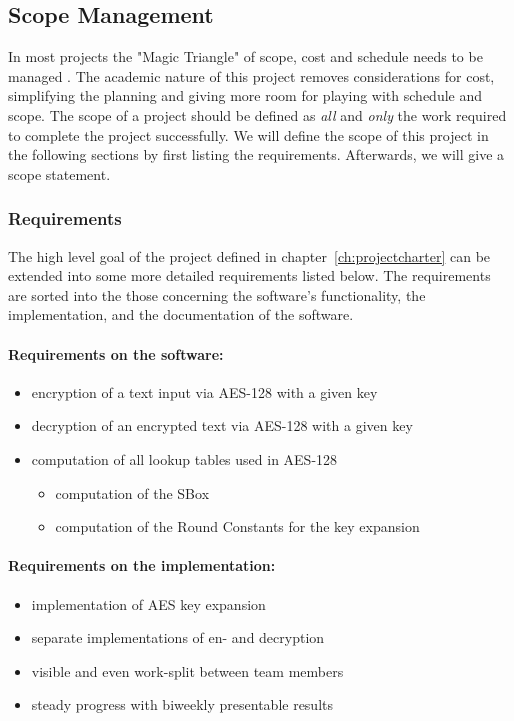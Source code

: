 \subsection{Scope Management}
\label{ch:scopemanagement}
In most projects the "Magic Triangle" of scope, cost and schedule needs to be managed \cite{vanwyngaard2012}. The academic nature of this project removes considerations for cost, simplifying the planning and giving more room for playing with schedule and scope. The scope of a project should be defined as \textit{all} and \textit{only} the work required to complete the project successfully. We will define the scope of this project in the following sections by first listing the requirements. Afterwards, we will give a scope statement.

\subsubsection{Requirements}
\label{ch:requirements}
The high level goal of the project defined in chapter~\ref{ch:projectcharter} can be extended into some more detailed requirements listed below. The requirements are sorted into the those concerning the software's functionality, the implementation, and the documentation of the software.
\paragraph{Requirements on the software:}
\begin{itemize}
  \item encryption of a text input via AES-128 with a given key
  \item decryption of an encrypted text via AES-128 with a given key
  \item computation of all lookup tables used in AES-128
  \begin{itemize}
    \item computation of the SBox
    \item computation of the Round Constants for the key expansion
  \end{itemize}
\end{itemize}

\paragraph{Requirements on the implementation:}
\begin{itemize}
  \item implementation of \ac{AES} key expansion
  \item separate implementations of en- and decryption
  \item visible and even work-split between team members
  \item steady progress with biweekly presentable results
\end{itemize}

